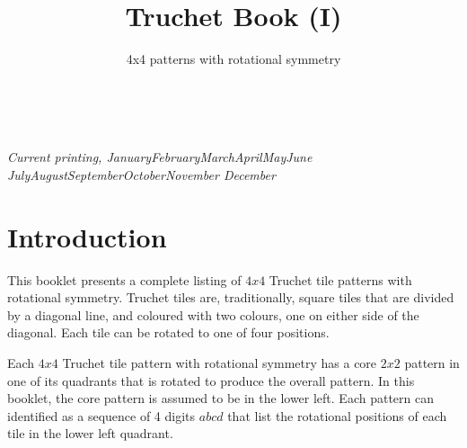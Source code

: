 \documentclass{tufte-book}
\title{Truchet Book (I)}
\subtitle{4x4 patterns with rotational symmetry}
\author[]{}
\newcommand{\monthyear}{%
  \ifcase\month\or January\or February\or March\or April\or May\or June\or
  July\or August\or September\or October\or November\or
  December\fi\space\number\year
}
\newcommand{\blankpage}{\newpage\hbox{}\thispagestyle{empty}\newpage}
\begin{document}



\maketitle


\newpage
\begin{fullwidth}
~\vfill
\thispagestyle{empty}
\setlength{\parindent}{0pt}
\setlength{\parskip}{\baselineskip}



\par\textit{Current printing, \monthyear}
\end{fullwidth}




\cleardoublepage



\chapter*{Introduction}

This booklet presents a complete listing of $4x4$ Truchet tile patterns with rotational symmetry.  \marginnote{} Truchet tiles are, traditionally, square tiles that are divided by a diagonal line, and coloured with two colours, one on either side of the diagonal. Each tile can be rotated to one of four positions.

\vspace{0.5cm}
\noindent
Each $4x4$  Truchet tile pattern with rotational symmetry has a core $2x2$ pattern in one of its quadrants that is rotated to produce the overall pattern. In this booklet, the core pattern is assumed to be in the lower left. Each pattern can identified as a sequence of 4 digits $abcd$ that list the rotational positions of each tile in the lower left quadrant.
\end{document}
